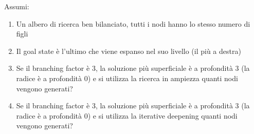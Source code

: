 \documentclass[a4paper]{article}
\begin{document}
\ex{}
{
  Assumi:
  \begin{enumerate}
    \item Un albero di ricerca ben bilanciato, tutti i nodi hanno lo stesso numero di figli
    \item Il goal state è l'ultimo che viene espanso nel suo livello (il più a destra)
    \item Se il branching factor è 3, la soluzione più superficiale è a profondità 3
      (la radice è a profondità 0) e si utilizza la ricerca in ampiezza quanti nodi
      vengono generati?
    \item Se il branching factor è 3, la soluzione più superficiale è a profondità 3
      (la radice è a profondità 0) e si utilizza la iterative deepening quanti nodi
      vengono generati?
  \end{enumerate}
}
\ex{}
\end{document}
